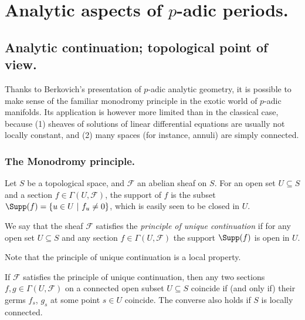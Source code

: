 \chapter{Analytic aspects of $p$-adic periods.}\label{chap-ana-p-period}
\minitoc
\newpage
\section{Analytic continuation; topological point of view.}\label{sec-1}

\begin{abst}
 Thanks to Berkovich's presentation of $p$-adic analytic geometry, it is
 possible to make sense of the familiar monodromy principle in the
 exotic world of $p$-adic manifolds. Its application is however more
 limited than in the classical case, because (1) sheaves of solutions of
 linear differential equations 
 are usually not locally constant, and (2) many spaces (for instance, 
 annuli) are simply connected.
\end{abst}


\subsection{The Monodromy principle.}
 
Let $S$ be a topological space, and $\mathcal{F}$ an abelian sheaf on $S$.
For an open set $U\subseteq S$ and a section $f\in\Gamma(U,\mathcal{F})$, the 
support of $f$ is the subset $\Supp(f)=\{u\in U\ |\ f_u\neq 0\}$, 
which is easily seen to be closed in $U$.

\begin{dfn}\label{dfn-unique-cont}
We say that the sheaf $\mathcal{F}$ satisfies the {\it principle of unique
continuation} if for any open set $U\subseteq S$ and any section 
$f\in\Gamma(U,\mathcal{F})$ the support $\Supp(f)$ is open in $U$.
\end{dfn}

Note that the principle of unique continuation is a local property.

\begin{lem}\label{lem-unique-cont}
If $\mathcal{F}$ satisfies the principle of unique continuation, then
any two sections $f,g\in\Gamma(U,\mathcal{F})$
on a connected open subset $U\subseteq S$ coincide if (and only if)
their germs $f_s$, $g_s$ at some point $s\in U$ coincide.
The converse also holds if $S$ is locally connected.
\end{lem} 

